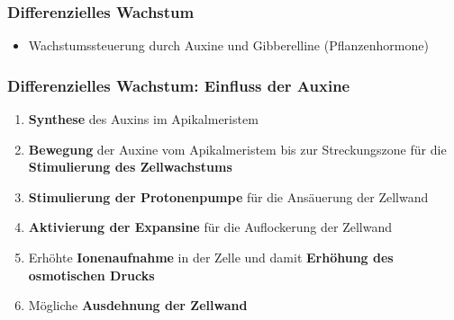 \documentclass[aspectratio=169
]{beamer}
\begin{document}
\begin{frame}[<+(1)->]
\frametitle{Differenzielles Wachstum}

\begin{itemize}
	\item Wachstumssteuerung durch Auxine und Gibberelline (Pflanzenhormone)
\end{itemize}

\end{frame}

\begin{frame}[<+(1)->]
\frametitle{Differenzielles Wachstum: Einfluss der Auxine}
\begin{enumerate}
\item \textbf{Synthese} des Auxins im Apikalmeristem 
\item \textbf{Bewegung} der Auxine vom Apikalmeristem bis zur Streckungszone für die \textbf{Stimulierung des Zellwachstums}
\item \textbf{Stimulierung der Protonenpumpe} für die Ansäuerung der Zellwand 
\item \textbf{Aktivierung der Expansine} für die Auflockerung der Zellwand
\item Erhöhte \textbf{Ionenaufnahme} in der Zelle und damit \textbf{Erhöhung des osmotischen Drucks}
\item Mögliche \textbf{Ausdehnung der Zellwand}
\end{enumerate}
\end{frame}
	
\end{document}
